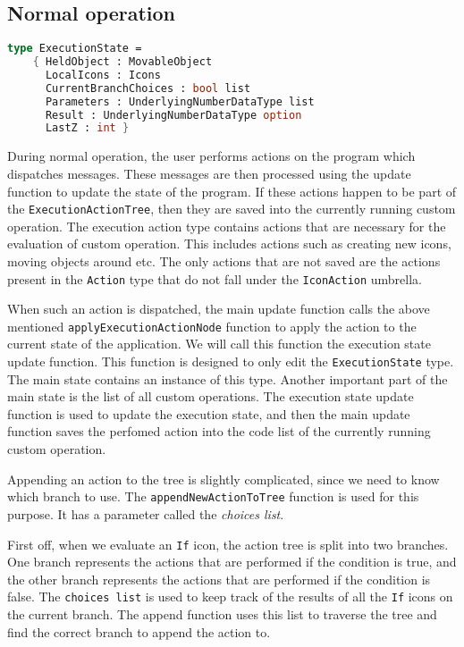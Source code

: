 \documentclass{report}
\begin{document}
\subsection*{Normal operation}

\begin{lstlisting}[language=fsharp]
type ExecutionState =
    { HeldObject : MovableObject
      LocalIcons : Icons
      CurrentBranchChoices : bool list
      Parameters : UnderlyingNumberDataType list
      Result : UnderlyingNumberDataType option
      LastZ : int }
\end{lstlisting}

During normal operation, the user performs actions on the program which dispatches messages. These messages are then processed using the update function to update the state of the program.
If these actions happen to be part of the \texttt{ExecutionActionTree}, then they are saved into the currently running custom operation.
The execution action type contains actions that are necessary for the evaluation of custom operation. This includes actions such as creating new icons, moving objects around etc. The only actions that are not saved are the actions present in the \texttt{Action} type that do not fall under the \texttt{IconAction} umbrella.

When such an action is dispatched, the main update function calls the above mentioned \texttt{applyExecutionActionNode} function to apply the action to the current state of the application. We will call this function the execution state update function.
This function is designed to only edit the \texttt{ExecutionState} type. The main state contains an instance of this type. Another important part of the main state is the list of all custom operations.
The execution state update function is used to update the execution state, and then the main update function saves the perfomed action into the code list of the currently running custom operation.

Appending an action to the tree is slightly complicated, since we need to know which branch to use.
The \texttt{appendNewActionToTree} function is used for this purpose. It has a parameter called the \emph{choices list}.

First off, when we evaluate an \texttt{If} icon, the action tree is split into two branches. One branch represents the actions that are performed if the condition is true, and the other branch represents the actions that are performed if the condition is false.
The \texttt{choices list} is used to keep track of the results of all the \texttt{If} icons on the current branch.
The append function uses this list to traverse the tree and find the correct branch to append the action to.
\end{document}
